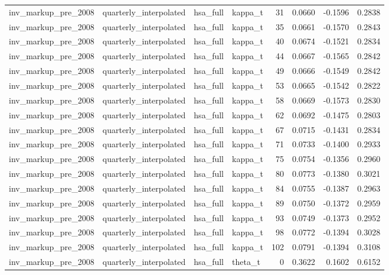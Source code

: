 \begin{tabular}{llllrrrr}
inv\_markup\_pre\_2008 & quarterly\_interpolated & hsa\_full & kappa\_t & 31 & 0.0660 & -0.1596 & 0.2838 \\
inv\_markup\_pre\_2008 & quarterly\_interpolated & hsa\_full & kappa\_t & 35 & 0.0661 & -0.1570 & 0.2843 \\
inv\_markup\_pre\_2008 & quarterly\_interpolated & hsa\_full & kappa\_t & 40 & 0.0674 & -0.1521 & 0.2834 \\
inv\_markup\_pre\_2008 & quarterly\_interpolated & hsa\_full & kappa\_t & 44 & 0.0667 & -0.1565 & 0.2842 \\
inv\_markup\_pre\_2008 & quarterly\_interpolated & hsa\_full & kappa\_t & 49 & 0.0666 & -0.1549 & 0.2842 \\
inv\_markup\_pre\_2008 & quarterly\_interpolated & hsa\_full & kappa\_t & 53 & 0.0665 & -0.1542 & 0.2822 \\
inv\_markup\_pre\_2008 & quarterly\_interpolated & hsa\_full & kappa\_t & 58 & 0.0669 & -0.1573 & 0.2830 \\
inv\_markup\_pre\_2008 & quarterly\_interpolated & hsa\_full & kappa\_t & 62 & 0.0692 & -0.1475 & 0.2803 \\
inv\_markup\_pre\_2008 & quarterly\_interpolated & hsa\_full & kappa\_t & 67 & 0.0715 & -0.1431 & 0.2834 \\
inv\_markup\_pre\_2008 & quarterly\_interpolated & hsa\_full & kappa\_t & 71 & 0.0733 & -0.1400 & 0.2933 \\
inv\_markup\_pre\_2008 & quarterly\_interpolated & hsa\_full & kappa\_t & 75 & 0.0754 & -0.1356 & 0.2960 \\
inv\_markup\_pre\_2008 & quarterly\_interpolated & hsa\_full & kappa\_t & 80 & 0.0773 & -0.1380 & 0.3021 \\
inv\_markup\_pre\_2008 & quarterly\_interpolated & hsa\_full & kappa\_t & 84 & 0.0755 & -0.1387 & 0.2963 \\
inv\_markup\_pre\_2008 & quarterly\_interpolated & hsa\_full & kappa\_t & 89 & 0.0750 & -0.1372 & 0.2959 \\
inv\_markup\_pre\_2008 & quarterly\_interpolated & hsa\_full & kappa\_t & 93 & 0.0749 & -0.1373 & 0.2952 \\
inv\_markup\_pre\_2008 & quarterly\_interpolated & hsa\_full & kappa\_t & 98 & 0.0772 & -0.1394 & 0.3028 \\
inv\_markup\_pre\_2008 & quarterly\_interpolated & hsa\_full & kappa\_t & 102 & 0.0791 & -0.1394 & 0.3108 \\
inv\_markup\_pre\_2008 & quarterly\_interpolated & hsa\_full & theta\_t & 0 & 0.3622 & 0.1602 & 0.6152 \\

\end{tabular}

